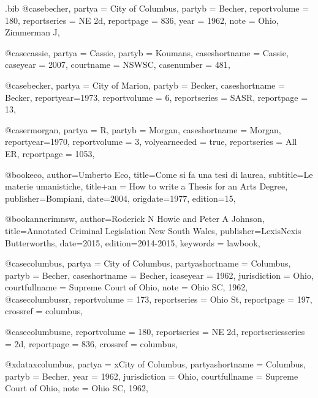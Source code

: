\begin{filecontents*}[overwrite]{\jobname.bib}
@case{becher,
  partya = {City of Columbus}, 
  partyb = {Becher},
  reportvolume = {180},
  reportseries = {NE 2d},
  reportpage = {836},
  year = {1962},
  note = {Ohio, Zimmerman J},
}


@case{cassie,
  partya = {Cassie}, 
  partyb = {Koumans},
  caseshortname = {Cassie},
  caseyear = {2007},
  courtname = {NSWSC},
  casenumber = {481},
}


@case{becker,
  partya = {City of Marion}, 
  partyb = {Becker},
  caseshortname = {Becker},
  reportyear={1973},
  reportvolume = {6},
  reportseries = {SASR},
  reportpage = {13},
}

@case{rmorgan,
  partya = {R}, 
  partyb = {Morgan},
  caseshortname = {Morgan},
  reportyear={1970},
  reportvolume = {3},
  volyearneeded = {true},
  reportseries = {All ER},
  reportpage = {1053},
}


@book{eco,
author={Umberto Eco},
title={Come si fa una tesi di laurea},
subtitle={Le materie umanistiche},
title+an = {How to write a Thesis for an Arts Degree},
publisher={Bompiani},
date={2004},
origdate={1977},
edition={15},
}

@book{anncrimnsw,
author={Roderick N Howie and Peter A Johnson},
title={Annotated Criminal Legislation New South Wales},
publisher={LexisNexis Butterworths},
date={2015},
edition={2014-2015},
keywords = {lawbook},
}

@case{columbus,
  partya = {City of Columbus},
  partyashortname = {Columbus}, 
  partyb = {Becher},
  caseshortname = {Becher},
  icaseyear = {1962},
  jurisdiction = {Ohio},
  courtfullname = {Supreme Court of Ohio},
  note = {Ohio SC, 1962},
}
@case{columbussr,
  reportvolume = {173},
  reportseries = {Ohio St},
  reportpage = {197},
  crossref = {columbus},
}

@case{columbusne,
  reportvolume = {180},
  reportseries = {NE 2d},
  reportseriesseries = {2d},
  reportpage = {836},
  crossref = {columbus},
}

@xdata{xcolumbus,
  partya = {xCity of Columbus},
  partyashortname = {Columbus}, 
  partyb = {Becher},
  year = {1962},
  jurisdiction = {Ohio},
  courtfullname = {Supreme Court of Ohio},
  note = {Ohio SC, 1962},
}


\end{filecontents*}
